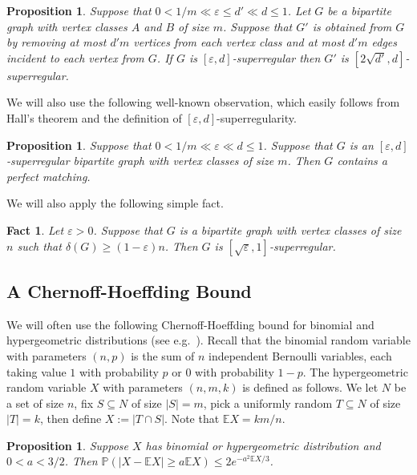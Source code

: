 \documentclass{memo-l}
\newtheorem{prop}[firstthm]{Proposition}
\newtheorem{fact}[firstthm]{Fact}
\def\eps{\varepsilon}
\def\ex{\mathbb{E}}
\numberwithin{section}{chapter}
\numberwithin{equation}{section}
\numberwithin{firstthm}{section}
\numberwithin{figure}{section}
\begin{document}
\begin{prop} \label{superslice}
Suppose that $0 <1/m \ll \eps \le d' \ll d \leq 1$.
Let $G$ be a bipartite graph with vertex classes $A$ and $B$ of size $m$.
Suppose that $G'$ is obtained from $G$ by removing at most $d'm$ vertices from each vertex class and at most $d'm$ edges incident to each vertex from $G$.
If $G$ is $[\eps,d]$-superregular then $G'$ is $[2\sqrt{d'},d]$-superregular.
\end{prop}

We will also use the following well-known observation, which 
easily follows from Hall's theorem and the definition of $[\eps, d]$-superregularity.

\begin{prop}\label{perfmatch}
Suppose that $0 <1/m \ll \eps \ll d \le 1$.
Suppose that $G$ is an $[\eps, d]$-superregular bipartite graph with vertex classes of size $m$.
Then $G$ contains a perfect matching.
\end{prop}

We will also apply the following simple fact.
\begin{fact}\label{simplefact} Let $\eps >0$.
Suppose that $G$ is a bipartite graph with vertex classes  of size $n$ such that
$\delta (G) \geq (1-\eps)n$. Then $G$ is $[\sqrt{\eps},1]$-superregular.
\end{fact}

\subsection{A Chernoff-Hoeffding Bound}
We will often use the following Cher\-noff-Hoeffding bound for binomial and hypergeometric
distributions (see e.g.~\cite[Corollary 2.3 and Theorem 2.10]{Janson&Luczak&Rucinski00}).
Recall that the binomial random variable with parameters $(n,p)$ is the sum
of $n$ independent Bernoulli variables, each taking value $1$ with probability $p$
or $0$ with probability $1-p$.
The hypergeometric random variable $X$ with parameters $(n,m,k)$ is
defined as follows. We let $N$ be a set of size $n$, fix $S \subseteq N$ of size
$|S|=m$, pick a uniformly random $T \subseteq N$ of size $|T|=k$,
then define $X:=|T \cap S|$. Note that $\ex X = km/n$.

\begin{prop}\label{chernoff}
Suppose $X$ has binomial or hypergeometric distribution and $0<a<3/2$. Then
$\mathbb{P}(|X - \mathbb{E}X| \ge a\mathbb{E}X) \le 2 e^{-a^2\mathbb{E}X /3}$.
\end{prop}
\end{document}
